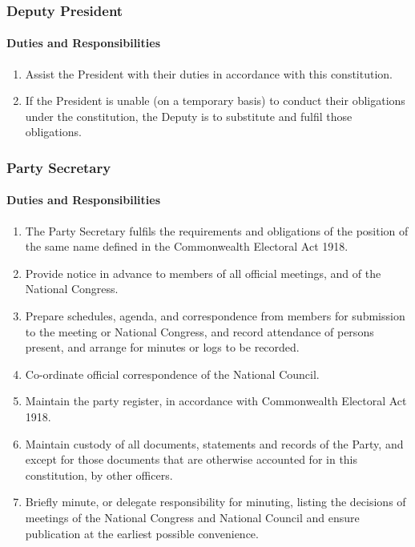 \documentclass[a4paper,titlepage,8.5pt]{article}
\begin{document}
\subsubsection{Deputy President}

\paragraph{Duties and Responsibilities}

\begin{enumerate}
\item Assist the President with their duties in accordance with this constitution.
\item If the President is unable (on a temporary basis) to conduct their obligations under the constitution, the Deputy is to substitute and fulfil those obligations.
\end{enumerate}

\subsubsection{Party Secretary}

\paragraph{Duties and Responsibilities}

\begin{enumerate}
\item The Party Secretary fulfils the requirements and obligations of the position of the same name defined in the Commonwealth Electoral Act 1918.
\item Provide notice in advance to members of all official meetings, and of the National Congress.
\item Prepare schedules, agenda, and correspondence from members for submission to the meeting or National Congress, and record attendance of persons present, and arrange for minutes or logs to be recorded.
\item Co-ordinate official correspondence of the National Council.
\item Maintain the party register, in accordance with Commonwealth Electoral Act 1918.
\item Maintain custody of all documents, statements and records of the Party, and except for those documents that are otherwise accounted for in this constitution, by other officers.
\item Briefly minute, or delegate responsibility for minuting, listing the decisions of meetings of the National Congress and National Council and ensure publication at the earliest possible convenience.
\end{enumerate}
\end{document}
